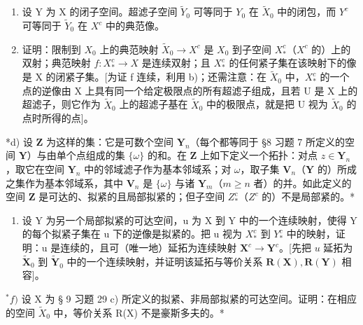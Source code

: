 \begin{enumerate}
\def\labelenumi{\alph{enumi})}
\setcounter{enumi}{1}
\item
  设 Y 为 X 的闭子空间。超滤子空间 \(\tilde{Y}_{0}\) 可等同于 \(Y_{0}\) 在 \(\tilde{X}_{0}\) 中的闭包，而 \(Y^{c}\) 可等同于 \(\tilde{Y}_{0}\) 在 \(X^{c}\) 中的典范像。
\item
  证明：限制到 \(X_{0}\) 上的典范映射 \(\tilde{X}_{0} \rightarrow X^{c}\) 是 \(X_{0}\) 到子空间 \(X_{*}^{c}\)（\(X^{c}\) 的）上的双射；典范映射 \(f: X_{*}^{c} \rightarrow X\) 是连续双射；且 \(X_{*}^{c}\) 的任何紧子集在该映射下的像是 X 的闭紧子集。{[}为证 f 连续，利用 b)；还需注意：在 \(\tilde{X}_{0}\) 中，\(X_{*}^{c}\) 的一个点的逆像由 X 上具有同一个给定极限点的所有超滤子组成，且若 U 是 X 上的超滤子，则它作为 \(\tilde{X}_{0}\) 上的超滤子基在 \(\tilde{X}_{0}\) 中的极限点，就是把 U 视为 \(\tilde{X}_{0}\) 的点时所得的点{]}。
\end{enumerate}

*d) 设 \(\mathbf{Z}\) 为这样的集：它是可数个空间 \(\mathbf{Y}_n\)（每个都等同于 §8 习题 7 所定义的空间 \(\mathbf{Y}\)）与由单个点组成的集 \(\{\omega\}\) 的和。在 \(\mathbf{Z}\) 上如下定义一个拓扑：对点 \(z \in \mathbf{Y}_n\)，取它在空间 \(\mathbf{Y}_n\) 中的邻域滤子作为基本邻域系；对 \(\omega\)，取子集 \(\mathbf{V}_n\)（\(\mathbf{Y}\) 的）所成之集作为基本邻域系，其中 \(\mathbf{V}_n\) 是 \(\{\omega\}\) 与诸 \(\mathbf{Y}_m\)（\(m \geqslant n\) 者）的并。如此定义的空间 \(\mathbf{Z}\) 是可达的、拟紧的且局部拟紧的；但子空间 \(Z_*^c\)（\(Z^c\) 的）不是局部紧的。*

\begin{enumerate}
\def\labelenumi{\alph{enumi})}
\setcounter{enumi}{4}
\tightlist
\item
  设 Y 为另一个局部拟紧的可达空间，u 为 X 到 Y 中的一个连续映射，使得 Y 的每个拟紧子集在 u 下的逆像是拟紧的。把 u 视为 \(X_{*}^{c}\) 到 \(Y_{*}^{c}\) 中的映射，证明：u 是连续的，且可（唯一地）延拓为连续映射 \(\mathbf{X}^c\to \mathbf{Y}^c\)。{[}先把 \(u\) 延拓为 \(\tilde{\mathbf{X}}_0\) 到 \(\tilde{\mathbf{Y}}_0\) 中的一个连续映射，并证明该延拓与等价关系 \(\mathbf{R}(\mathbf{X}),\mathbf{R}(\mathbf{Y})\) 相容{]}。
\end{enumerate}

\(^{*}f)\) 设 X 为 § 9 习题 29 c) 所定义的拟紧、非局部拟紧的可达空间。证明：在相应的空间 \(\tilde{X}_{0}\) 中，等价关系 R(X) 不是豪斯多夫的。*

